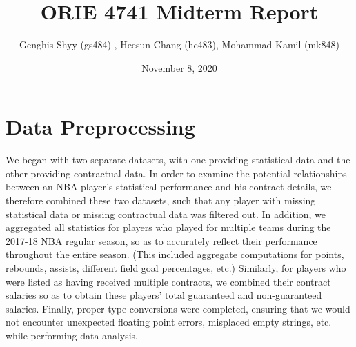 \documentclass{article}
\title{ORIE 4741 Midterm Report}
\author{Genghis Shyy (gs484) , Heesun Chang (hc483), Mohammad Kamil (mk848) }
\date{November 8, 2020}
\begin{document}
\maketitle

\section{Data Preprocessing}
We began with two separate datasets, with one providing statistical data and the other providing contractual data. In order to examine the potential relationships between an NBA player's statistical performance and his contract details, we therefore combined these two datasets, such that any player with missing statistical data or missing contractual data was filtered out. In addition, we aggregated all statistics for players who played for multiple teams during the 2017-18 NBA regular season, so as to accurately reflect their performance throughout the entire season. (This included aggregate computations for points, rebounds, assists, different field goal percentages, etc.) Similarly, for players who were listed as having received multiple contracts, we combined their contract salaries so as to obtain these players' total guaranteed and non-guaranteed salaries. Finally, proper type conversions were completed, ensuring that we would not encounter unexpected floating point errors, misplaced empty strings, etc. while performing data analysis.
\end{document}

